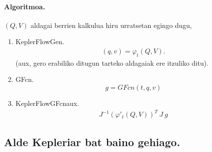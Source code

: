 \paragraph*{Algoritmoa.}

$(Q,V)$ aldagai berrien kalkulua hiru urratsetan egingo dugu,
\begin{enumerate}
\item KeplerFlowGen.
\begin{align*}
(q,v)= \varphi_t(Q,V). 
\end{align*}
(aux, gero erabiliko ditugun tarteko aldagaiak ere itzuliko ditu).
\item GFcn.
\begin{equation*}
g=GFcn(t,q,v)
\end{equation*}
\item KeplerFlowGFcnaux.
\begin{align*}
J^{-1} ( \varphi'_t(Q,V))^T \ J \ g
\end{align*}
\end{enumerate} 

\subsection*{Alde Kepleriar bat baino gehiago.}


